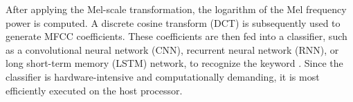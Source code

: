 After applying the Mel-scale transformation, the logarithm of the Mel frequency power is computed. A discrete cosine transform (DCT) is subsequently used to generate MFCC coefficients. These coefficients are then fed into a classifier, such as a convolutional neural network (CNN), recurrent neural network (RNN), or long short-term memory (LSTM) network, to recognize the keyword \cite{mahmood2021speech}. Since the classifier is hardware-intensive and computationally demanding, it is most efficiently executed on the host processor.